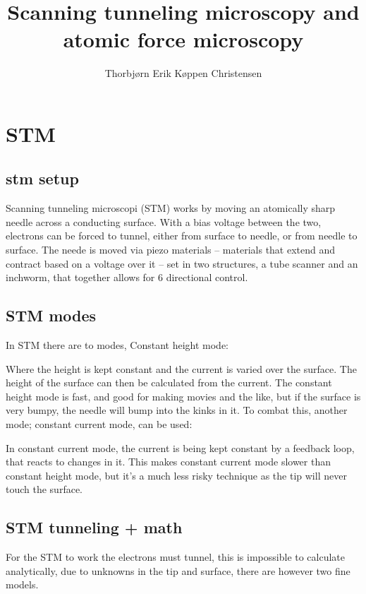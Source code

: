 \documentclass[article,oneside]{memoir}
\title{Scanning tunneling microscopy and atomic force microscopy}
\author{Thorbjørn Erik Køppen Christensen}
\begin{document}
\maketitle
\chapter{STM}
\section{stm setup}

Scanning tunneling microscopi (STM) works by moving an atomically sharp needle across a conducting surface. With a bias voltage between the two, electrons can be forced to tunnel, either from surface to needle, or from needle to surface. The neede is moved via piezo materials -- materials that extend and contract based on a voltage over it -- set in two structures, a tube scanner and an inchworm, that together allows for 6 directional control. 
\section{STM modes}
In STM there are to modes, Constant height mode:


Where the height is kept constant and the current is varied over the surface. The height of the surface can then be calculated from the current. The constant height mode is fast, and good for making movies and the like, but if the surface is very bumpy, the needle will bump into the kinks in it. To combat this, another mode; constant current mode, can be used:


In constant current mode, the current is being kept constant by a feedback loop, that reacts to changes in it. This makes constant current mode slower than constant height mode, but it's a much less risky technique as the tip will never touch the surface.

\section{STM tunneling + math}
For the STM to work the electrons must tunnel, this is impossible to calculate analytically, due to unknowns in the tip and surface, there are however two fine models.
\end{document}
